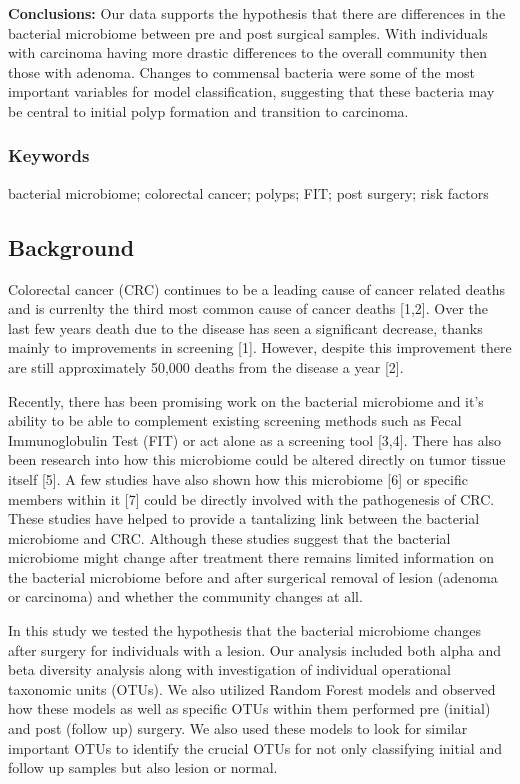 \documentclass[12pt,]{article}
\begin{document}
\textbf{Conclusions:} Our data supports the hypothesis that there are
differences in the bacterial microbiome between pre and post surgical
samples. With individuals with carcinoma having more drastic differences
to the overall community then those with adenoma. Changes to commensal
bacteria were some of the most important variables for model
classification, suggesting that these bacteria may be central to initial
polyp formation and transition to carcinoma.

\newpage

\subsubsection{Keywords}\label{keywords}

bacterial microbiome; colorectal cancer; polyps; FIT; post surgery; risk
factors

\newpage

\subsection{Background}\label{background}

Colorectal cancer (CRC) continues to be a leading cause of cancer
related deaths and is currenlty the third most common cause of cancer
deaths {[}1,2{]}. Over the last few years death due to the disease has
seen a significant decrease, thanks mainly to improvements in screening
{[}1{]}. However, despite this improvement there are still approximately
50,000 deaths from the disease a year {[}2{]}.

Recently, there has been promising work on the bacterial microbiome and
it's ability to be able to complement existing screening methods such as
Fecal Immunoglobulin Test (FIT) or act alone as a screening tool
{[}3,4{]}. There has also been research into how this microbiome could
be altered directly on tumor tissue itself {[}5{]}. A few studies have
also shown how this microbiome {[}6{]} or specific members within it
{[}7{]} could be directly involved with the pathogenesis of CRC. These
studies have helped to provide a tantalizing link between the bacterial
microbiome and CRC. Although these studies suggest that the bacterial
microbiome might change after treatment there remains limited
information on the bacterial microbiome before and after surgerical
removal of lesion (adenoma or carcinoma) and whether the community
changes at all.

In this study we tested the hypothesis that the bacterial microbiome
changes after surgery for individuals with a lesion. Our analysis
included both alpha and beta diversity analysis along with investigation
of individual operational taxonomic units (OTUs). We also utilized
Random Forest models and observed how these models as well as specific
OTUs within them performed pre (initial) and post (follow up) surgery.
We also used these models to look for similar important OTUs to identify
the crucial OTUs for not only classifying initial and follow up samples
but also lesion or normal.
\end{document}
